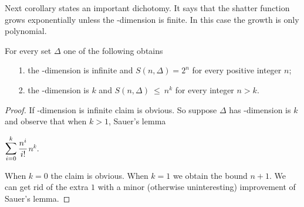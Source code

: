 \documentclass[creche.tex]{subfiles}
\begin{document}
Next corollary states an important dichotomy. It says that the shatter function grows exponentially unless the \vc-dimension is finite. In this case the growth is only polynomial.


\begin{corollary}\label{coroll_Sauer}
For every set $\Delta$ one of the following obtains
\begin{itemize}
 \item[1.] the \vc-dimension is infinite and $S(n,\Delta)=2^n$ for every positive integer $n$;
 \item[2.] the \vc-dimension is $k$ and $S(n,\Delta)\ \le\ n^k$ for every integer $n> k$.
\end{itemize}
\end{corollary}
\begin{proof}
If \vc-dimension is infinite claim  is obvious. So suppose $\Delta$ has \vc-dimension is $k$ and observe that when $k>1$, Sauer's lemma

\medrel{\le}$\displaystyle\mathop{\mbox{\large$\displaystyle\sum$}}^k_{i=0}\frac{n^i}{i!}$\medrel{\le}$n^k$.

When $k=0$ the claim is obvious. When $k=1$ we obtain the bound $n+1$. We can get rid of the extra $1$ with a minor (otherwise uninteresting) improvement of Sauer's lemma.
\end{proof}

% 
% 
% 
% 
% 
\end{document}
